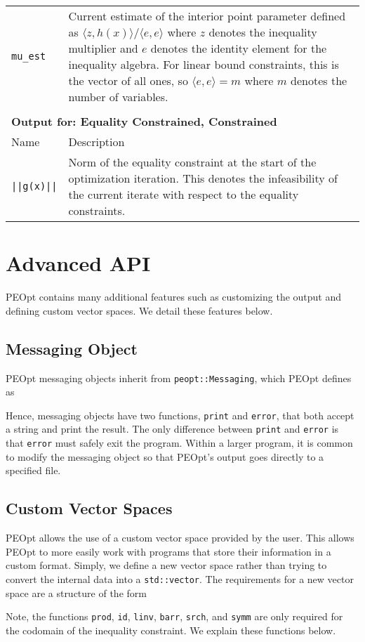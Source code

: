 \documentclass{report}
\begin{document}
\begin{longtable}{lp{}}
\texttt{mu\_est} & Current estimate of the interior point parameter defined as $\langle z,h(x) \rangle/\langle e,e\rangle$ where $z$ denotes the inequality multiplier and $e$ denotes the identity element for the inequality algebra.  For linear bound constraints, this is the vector of all ones, so $\langle e,e\rangle=m$ where $m$ denotes the number of variables.\\
\\
\multicolumn{2}{p{\textwidth}}{\bf Output for: Equality Constrained, Constrained}\\
Name & Description\\
\texttt{||g(x)||} & Norm of the equality constraint at the start of the optimization iteration.  This denotes the infeasibility of the current iterate with respect to the equality constraints. 
\end{longtable}

\chapter{Advanced API}\label{ch:Advanced}

        PEOpt contains many additional features such as customizing the output and defining custom vector spaces.  We detail these features below.

\section{Messaging Object}

        PEOpt messaging objects inherit from \texttt{peopt::Messaging}, which PEOpt defines as

Hence, messaging objects have two functions, \texttt{print} and \texttt{error}, that both accept a string and print the result.  The only difference between \texttt{print} and \texttt{error} is that \texttt{error} must safely exit the program.  Within a larger program, it is common to modify the messaging object so that PEOpt's output goes directly to a specified file.

\section{Custom Vector Spaces}

        PEOpt allows the use of a custom vector space provided by the user.  This allows PEOpt to more easily work with programs that store their information in a custom format.  Simply, we define a new vector space rather than trying to convert the internal data into a \texttt{std::vector}.  The requirements for a new vector space are a structure of the form

Note, the functions \texttt{prod}, \texttt{id}, \texttt{linv}, \texttt{barr}, \texttt{srch}, and \texttt{symm} are only required for the codomain of the inequality constraint.  We explain these functions below.
\end{document}
